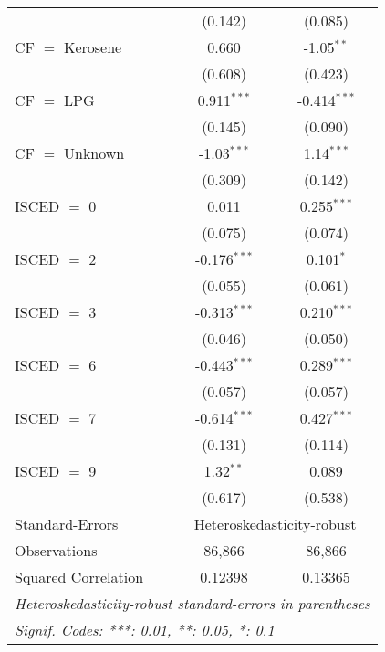 \begin{table}[htbp!]
\begin{adjustbox}{width = 1\textwidth, max height = 0.95\textheight, center}
\begin{threeparttable}[b]
\begin{tabular}{lcc}
                                 & (0.142)        & (0.085)\\   
            CF $=$ Kerosene      & 0.660          & -1.05$^{**}$\\   
                                 & (0.608)        & (0.423)\\   
            CF $=$ LPG           & 0.911$^{***}$  & -0.414$^{***}$\\   
                                 & (0.145)        & (0.090)\\   
            CF $=$ Unknown       & -1.03$^{***}$  & 1.14$^{***}$\\   
                                 & (0.309)        & (0.142)\\   
            ISCED $=$ 0          & 0.011          & 0.255$^{***}$\\   
                                 & (0.075)        & (0.074)\\   
            ISCED $=$ 2          & -0.176$^{***}$ & 0.101$^{*}$\\   
                                 & (0.055)        & (0.061)\\   
            ISCED $=$ 3          & -0.313$^{***}$ & 0.210$^{***}$\\   
                                 & (0.046)        & (0.050)\\   
            ISCED $=$ 6          & -0.443$^{***}$ & 0.289$^{***}$\\   
                                 & (0.057)        & (0.057)\\   
            ISCED $=$ 7          & -0.614$^{***}$ & 0.427$^{***}$\\   
                                 & (0.131)        & (0.114)\\   
            ISCED $=$ 9          & 1.32$^{**}$    & 0.089\\   
                                 & (0.617)        & (0.538)\\   
            \midrule 
            Standard-Errors & \multicolumn{2}{c}{Heteroskedasticity-robust} \\ 
            Observations         & 86,866         & 86,866\\  
            Squared Correlation  & 0.12398        & 0.13365\\  
            \midrule \midrule
            \multicolumn{3}{l}{\emph{Heteroskedasticity-robust standard-errors in parentheses}}\\
            \multicolumn{3}{l}{\emph{Signif. Codes: ***: 0.01, **: 0.05, *: 0.1}}\\
         \end{tabular}
         

\end{threeparttable}
\end{adjustbox}
\end{table}
